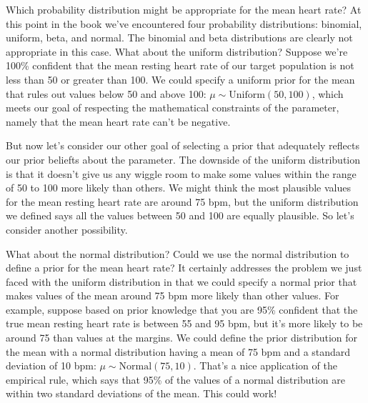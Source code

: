 \documentclass[
]{book}
\begin{document}
Which probability distribution might be appropriate for the mean heart rate? At this point in the book we've encountered four probability distributions: binomial, uniform, beta, and normal. The binomial and beta distributions are clearly not appropriate in this case. What about the uniform distribution? Suppose we're 100\% confident that the mean resting heart rate of our target population is not less than 50 or greater than 100. We could specify a uniform prior for the mean that rules out values below 50 and above 100: \(\mu \sim \mathrm{Uniform}(50, 100)\), which meets our goal of respecting the mathematical constraints of the parameter, namely that the mean heart rate can't be negative.

But now let's consider our other goal of selecting a prior that adequately reflects our prior beliefts about the parameter. The downside of the uniform distribution is that it doesn't give us any wiggle room to make some values within the range of 50 to 100 more likely than others. We might think the most plausible values for the mean resting heart rate are around 75 bpm, but the uniform distribution we defined says all the values between 50 and 100 are equally plausible. So let's consider another possibility.

What about the normal distribution? Could we use the normal distribution to define a prior for the mean heart rate? It certainly addresses the problem we just faced with the uniform distribution in that we could specify a normal prior that makes values of the mean around 75 bpm more likely than other values. For example, suppose based on prior knowledge that you are 95\% confident that the true mean resting heart rate is between 55 and 95 bpm, but it's more likely to be around 75 than values at the margins. We could define the prior distribution for the mean with a normal distribution having a mean of 75 bpm and a standard deviation of 10 bpm: \(\mu \sim \mathrm{Normal}(75, 10)\). That's a nice application of the empirical rule, which says that 95\% of the values of a normal distribution are within two standard deviations of the mean. This could work!
\end{document}
